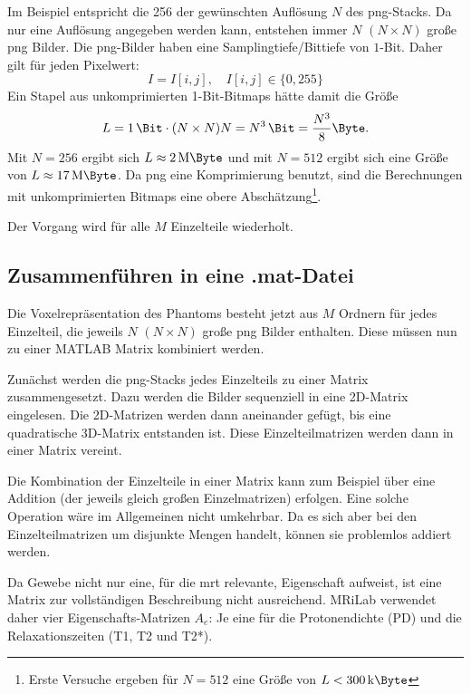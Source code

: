 Im Beispiel entspricht die 256 der gewünschten Auflösung $N$ des png-Stacks. Da nur eine Auflösung angegeben werden kann, entstehen immer $N$ $(N\times N)$ große png Bilder. Die png-Bilder haben eine Samplingtiefe/Bittiefe von $1$-Bit. Daher gilt für jeden Pixelwert:
\begin{equation}
	I = I[i,j] , \quad I[i,j] \in \{0, 255\}
\end{equation}
Ein Stapel aus unkomprimierten 1-Bit-Bitmaps hätte damit die Größe
\begin{equation}
	L=\SI{1}{\Bit} \cdot (N \times N) N = N^3 \,\SI{}{\Bit} = \frac{N^3}{8} \SI{}{\Byte}.
\end{equation}
Mit $N=256$ ergibt sich $L\approx \SI{2}{\mega\Byte}$ und mit $N=512$ ergibt sich eine Größe von $L\approx \SI{17}{\mega\Byte}$. Da png eine Komprimierung benutzt, sind die Berechnungen mit unkomprimierten Bitmaps eine obere Abschätzung\footnote{Erste Versuche ergeben für $N=512$ eine Größe von $L<\SI{300}{\kilo\Byte}$}.

Der Vorgang wird für alle $M$ Einzelteile wiederholt.

\subsection{Zusammenführen in eine .mat-Datei}
Die Voxelrepräsentation des Phantoms besteht jetzt aus $M$ Ordnern für jedes Einzelteil, die jeweils $N$ $(N \times N)$ große png Bilder enthalten. Diese müssen nun zu einer MATLAB Matrix kombiniert werden.

Zunächst werden die png-Stacks jedes Einzelteils zu einer Matrix zusammengesetzt. Dazu werden die Bilder sequenziell in eine 2D-Matrix eingelesen. Die 2D-Matrizen werden dann aneinander gefügt, bis eine quadratische 3D-Matrix entstanden ist. Diese Einzelteilmatrizen werden dann in einer Matrix vereint.

Die Kombination der Einzelteile in einer Matrix kann zum Beispiel über eine Addition (der jeweils gleich großen Einzelmatrizen) erfolgen. Eine solche Operation wäre im Allgemeinen nicht umkehrbar. Da es sich aber bei den Einzelteilmatrizen um disjunkte Mengen handelt, können sie problemlos addiert werden.

Da Gewebe nicht nur eine, für die \gls{mrt} relevante, Eigenschaft aufweist, ist eine Matrix zur vollständigen Beschreibung nicht ausreichend. MRiLab verwendet daher vier Eigenschafts-Matrizen $A_e$: Je eine für die Protonendichte (PD) und die Relaxationszeiten (T1, T2 und T2*).

